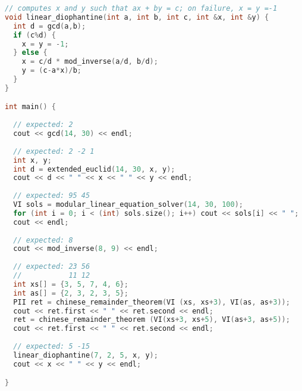 \begin{lstlisting}[language=C++]
// computes x and y such that ax + by = c; on failure, x = y =-1
void linear_diophantine(int a, int b, int c, int &x, int &y) {
  int d = gcd(a,b);
  if (c%d) {
    x = y = -1;
  } else {
    x = c/d * mod_inverse(a/d, b/d);
    y = (c-a*x)/b;
  }
}

int main() {
  
  // expected: 2
  cout << gcd(14, 30) << endl;
  
  // expected: 2 -2 1
  int x, y;
  int d = extended_euclid(14, 30, x, y);
  cout << d << " " << x << " " << y << endl;
  
  // expected: 95 45
  VI sols = modular_linear_equation_solver(14, 30, 100);
  for (int i = 0; i < (int) sols.size(); i++) cout << sols[i] << " "; 
  cout << endl;
  
  // expected: 8
  cout << mod_inverse(8, 9) << endl;
  
  // expected: 23 56
  //           11 12
  int xs[] = {3, 5, 7, 4, 6};
  int as[] = {2, 3, 2, 3, 5};
  PII ret = chinese_remainder_theorem(VI (xs, xs+3), VI(as, as+3));
  cout << ret.first << " " << ret.second << endl;
  ret = chinese_remainder_theorem (VI(xs+3, xs+5), VI(as+3, as+5));
  cout << ret.first << " " << ret.second << endl;
  
  // expected: 5 -15
  linear_diophantine(7, 2, 5, x, y);
  cout << x << " " << y << endl;

}

\end{lstlisting}
